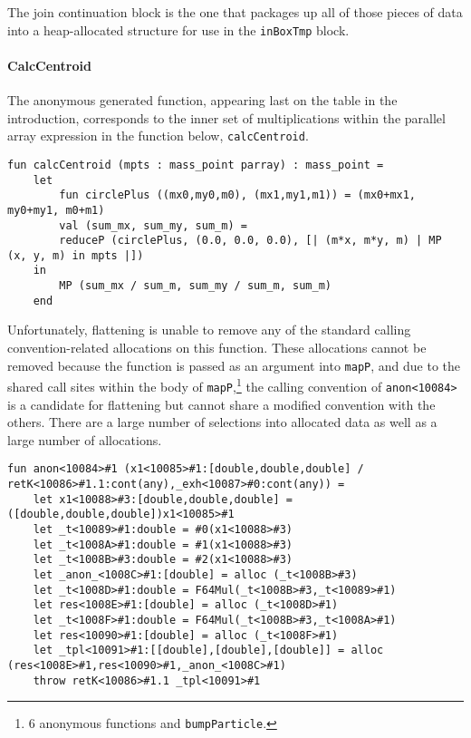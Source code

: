 \documentclass[11pt]{article}
\begin{document}
The join continuation block is the one that packages up all of those pieces of data into a heap-allocated structure for use in the \texttt{inBoxTmp} block.

\paragraph{CalcCentroid}

The anonymous generated function, appearing last on the table in the introduction, corresponds to the inner set of multiplications within the parallel array expression in the function below, \texttt{calcCentroid}.

\begin{lstlisting}
fun calcCentroid (mpts : mass_point parray) : mass_point = 
    let
        fun circlePlus ((mx0,my0,m0), (mx1,my1,m1)) = (mx0+mx1, my0+my1, m0+m1)
        val (sum_mx, sum_my, sum_m) = 
    	reduceP (circlePlus, (0.0, 0.0, 0.0), [| (m*x, m*y, m) | MP (x, y, m) in mpts |])
    in
        MP (sum_mx / sum_m, sum_my / sum_m, sum_m)
    end
\end{lstlisting}

Unfortunately, flattening is unable to remove any of the standard calling convention-related allocations on this function.
These allocations cannot be removed because the function is passed as an argument into \texttt{mapP}, and due to the shared call sites within the body of \texttt{mapP},\footnote{6 anonymous functions and \texttt{bumpParticle}.} the calling convention of \texttt{anon<10084>} is a candidate for flattening but cannot share a modified convention with the others.
There are a large number of selections into allocated data as well as a large number of allocations.

\begin{lstlisting}
fun anon<10084>#1 (x1<10085>#1:[double,double,double] / retK<10086>#1.1:cont(any),_exh<10087>#0:cont(any)) =
    let x1<10088>#3:[double,double,double] = ([double,double,double])x1<10085>#1
    let _t<10089>#1:double = #0(x1<10088>#3)
    let _t<1008A>#1:double = #1(x1<10088>#3)
    let _t<1008B>#3:double = #2(x1<10088>#3)
    let _anon_<1008C>#1:[double] = alloc (_t<1008B>#3)
    let _t<1008D>#1:double = F64Mul(_t<1008B>#3,_t<10089>#1)
    let res<1008E>#1:[double] = alloc (_t<1008D>#1)
    let _t<1008F>#1:double = F64Mul(_t<1008B>#3,_t<1008A>#1)
    let res<10090>#1:[double] = alloc (_t<1008F>#1)
    let _tpl<10091>#1:[[double],[double],[double]] = alloc (res<1008E>#1,res<10090>#1,_anon_<1008C>#1)
    throw retK<10086>#1.1 _tpl<10091>#1
\end{lstlisting}
\end{document}
